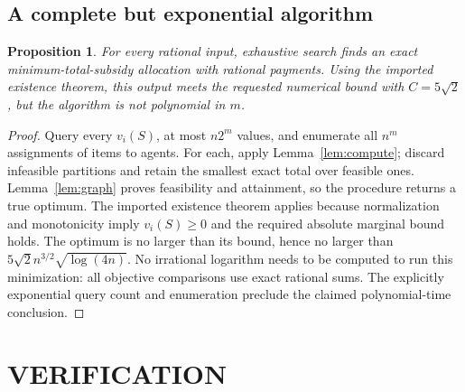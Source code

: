 \documentclass[11pt,a4paper]{article}
\newtheorem{proposition}[theorem]{Proposition}
\theoremstyle{remark}\newtheorem{remark}[theorem]{Remark}
\begin{document}
\subsection{A complete but exponential algorithm}
\begin{proposition}\label{prop:exhaustive}
For every rational input, exhaustive search finds an exact minimum-total-subsidy allocation with rational payments. Using the imported existence theorem, this output meets the requested numerical bound with $C=5\sqrt2$, but the algorithm is not polynomial in $m$.
\end{proposition}
\begin{proof}
Query every $v_i(S)$, at most $n2^m$ values, and enumerate all $n^m$ assignments of items to agents. For each, apply Lemma~\ref{lem:compute}; discard infeasible partitions and retain the smallest exact total over feasible ones. Lemma~\ref{lem:graph} proves feasibility and attainment, so the procedure returns a true optimum. The imported existence theorem applies because normalization and monotonicity imply $v_i(S)\ge0$ and the required absolute marginal bound holds. The optimum is no larger than its bound, hence no larger than $5\sqrt2 n^{3/2}\sqrt{\log(4n)}$. No irrational logarithm needs to be computed to run this minimization: all objective comparisons use exact rational sums. The explicitly exponential query count and enumeration preclude the claimed polynomial-time conclusion.
\end{proof}

\section{VERIFICATION}
\end{document}
